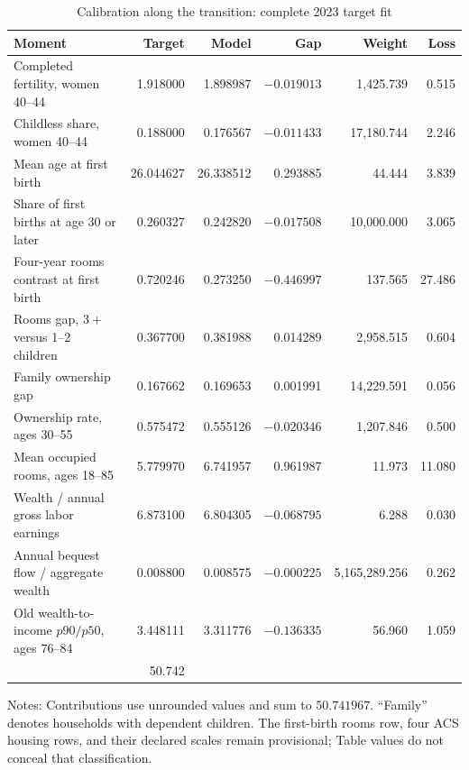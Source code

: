 \documentclass[11pt]{article}
\theoremstyle{definition}
\newcommand{\1}{\mathbf 1}
\begin{document}
\begin{table}[ht!]
\centering
\caption{Calibration along the transition: complete 2023 target fit}
\label{tab:transition_fit}
\scriptsize
\setlength{\tabcolsep}{3.1pt}
\begin{tabularx}{\textwidth}{@{}>{\raggedright\arraybackslash}Xrrrrr@{}}
\toprule
Moment & Target & Model & Gap & Weight & Loss \\
\midrule
Completed fertility, women 40--44
 & 1.918000 & 1.898987 & \(-0.019013\) & 1,425.739 & 0.515 \\
Childless share, women 40--44
 & 0.188000 & 0.176567 & \(-0.011433\) & 17,180.744 & 2.246 \\
Mean age at first birth
 & 26.044627 & 26.338512 & 0.293885 & 44.444 & 3.839 \\
Share of first births at age 30 or later
 & 0.260327 & 0.242820 & \(-0.017508\) & 10,000.000 & 3.065 \\
Four-year rooms contrast at first birth
 & 0.720246 & 0.273250 & \(-0.446997\) & 137.565 & 27.486 \\
Rooms gap, \(3+\) versus 1--2 children
 & 0.367700 & 0.381988 & 0.014289 & 2,958.515 & 0.604 \\
Family ownership gap
 & 0.167662 & 0.169653 & 0.001991 & 14,229.591 & 0.056 \\
Ownership rate, ages 30--55
 & 0.575472 & 0.555126 & \(-0.020346\) & 1,207.846 & 0.500 \\
Mean occupied rooms, ages 18--85
 & 5.779970 & 6.741957 & 0.961987 & 11.973 & 11.080 \\
Wealth / annual gross labor earnings
 & 6.873100 & 6.804305 & \(-0.068795\) & 6.288 & 0.030 \\
Annual bequest flow / aggregate wealth
 & 0.008800 & 0.008575 & \(-0.000225\) & 5,165,289.256 & 0.262 \\
Old wealth-to-income \(p90/p50\), ages 76--84
 & 3.448111 & 3.311776 & \(-0.136335\) & 56.960 & 1.059 \\
\midrule
\multicolumn{5}{r}{Total loss} & 50.742 \\
\bottomrule
\end{tabularx}

{\footnotesize Notes: Contributions use unrounded values and sum to
\(50.741967\). ``Family'' denotes households with dependent children. The
first-birth rooms row, four ACS housing rows, and their declared scales remain
provisional; Table values do not conceal that classification.\par}
\end{table}
\end{document}
